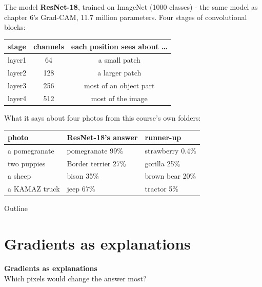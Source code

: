 \documentclass[aspectratio=169]{beamer}
\newcommand{\sectiontransition}[2]{%
  \begin{frame}[plain]
    \vfill
    \begin{center}
      {\Huge\bfseries\color{popblue} #1}\\[1.1em]
      {\large #2}
    \end{center}
    \vfill
  \end{frame}}
\begin{document}
\begin{frame}{The model}
  \vspace{0.6em}
  \textbf{ResNet-18}, trained on ImageNet (1000 classes) - the same model as chapter 6's Grad-CAM,
  11.7 million parameters. Four stages of convolutional blocks:

  \vspace{0.2em}
  \begin{center}
  \small
  \begin{tabular}{@{}lcc@{}}
    \toprule
    stage & channels & each position sees about \ldots\\
    \midrule
    layer1 & 64 & a small patch\\
    layer2 & 128 & a larger patch\\
    layer3 & 256 & most of an object part\\
    layer4 & 512 & most of the image\\
    \bottomrule
  \end{tabular}
  \end{center}

  \vspace{0.2em}
  What it says about four photos from this course's own folders:
  \begin{center}
  \small
  \begin{tabular}{@{}lll@{}}
    \toprule
    photo & ResNet-18's answer & runner-up\\
    \midrule
    a pomegranate & pomegranate 99\% & strawberry 0.4\%\\
    two puppies & Border terrier 27\% & gorilla 25\%\\
    a sheep & \textcolor{armred}{bison} 35\% & brown bear 20\%\\
    a KAMAZ truck & \textcolor{armred}{jeep} 67\% & tractor 5\%\\
    \bottomrule
  \end{tabular}
  \end{center}
\end{frame}

\begin{frame}{Outline}
  \tableofcontents
\end{frame}

\section{Gradients as explanations}
\sectiontransition{Gradients as explanations}{Which pixels would change the answer most?}
\end{document}
